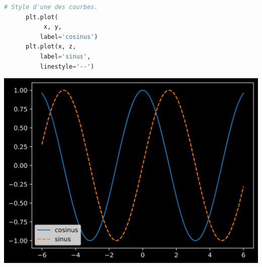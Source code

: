 \documentclass[aspectratio=169]{beamer}
\begin{document}
\begin{frame}[fragile]{}{}
  \vfill
  \begin{minipage}{.48\textwidth}
    \begin{lstlisting}[language=Python]
      # Style d'une des courbes.
      plt.plot(
           x, y,
          label='cosinus')
      plt.plot(x, z,
          label='sinus',
          linestyle='--')
    \end{lstlisting}
  \end{minipage}%
  \hfill
  \begin{minipage}{.48\textwidth}
    \centering
    \includegraphics[width=\textwidth]{mline_plot_style}
  \end{minipage}
  \vfill
\end{frame}

\frame{}
\end{document}

